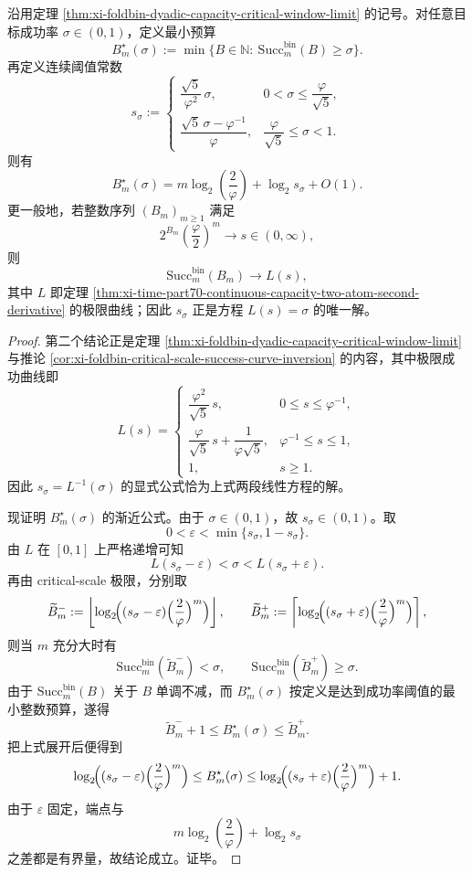 \begin{theorem}[目标成功率下最优辅助比特预算的严格分段阈值]\label{thm:xi-time-part70-target-success-optimal-budget-threshold}
沿用定理 \ref{thm:xi-foldbin-dyadic-capacity-critical-window-limit} 的记号。对任意目标成功率 \(\sigma\in(0,1)\)，定义最小预算
\[
B_m^\star(\sigma):=
\min\bigl\{B\in\mathbb N:\ \mathrm{Succ}_m^{\mathrm{bin}}(B)\ge \sigma\bigr\}.
\]
再定义连续阈值常数
\[
s_\sigma:=
\begin{cases}
\dfrac{\sqrt5}{\varphi^2}\,\sigma,
& 0<\sigma\le \dfrac{\varphi}{\sqrt5},\\[8pt]
\dfrac{\sqrt5\,\sigma-\varphi^{-1}}{\varphi},
& \dfrac{\varphi}{\sqrt5}\le \sigma<1.
\end{cases}
\]
则有
\[
B_m^\star(\sigma)
=
m\log_2\!\left(\frac{2}{\varphi}\right)+\log_2 s_\sigma+O(1).
\]
更一般地，若整数序列 \((B_m)_{m\ge 1}\) 满足
\[
2^{B_m}\left(\frac{\varphi}{2}\right)^m\longrightarrow s\in(0,\infty),
\]
则
\[
\mathrm{Succ}_m^{\mathrm{bin}}(B_m)\longrightarrow L(s),
\]
其中 \(L\) 即定理 \ref{thm:xi-time-part70-continuous-capacity-two-atom-second-derivative} 的极限曲线；因此 \(s_\sigma\) 正是方程 \(L(s)=\sigma\) 的唯一解。
\end{theorem}
\begin{proof}
第二个结论正是定理 \ref{thm:xi-foldbin-dyadic-capacity-critical-window-limit} 与推论 \ref{cor:xi-foldbin-critical-scale-success-curve-inversion} 的内容，其中极限成功曲线即
\[
L(s)=
\begin{cases}
\dfrac{\varphi^2}{\sqrt5}\,s, & 0\le s\le \varphi^{-1},\\[6pt]
\dfrac{\varphi}{\sqrt5}\,s+\dfrac{1}{\varphi\sqrt5}, & \varphi^{-1}\le s\le 1,\\[8pt]
1, & s\ge 1.
\end{cases}
\]
因此 \(s_\sigma=L^{-1}(\sigma)\) 的显式公式恰为上式两段线性方程的解。

现证明 \(B_m^\star(\sigma)\) 的渐近公式。由于 \(\sigma\in(0,1)\)，故 \(s_\sigma\in(0,1)\)。取
\[
0<\varepsilon<\min\{s_\sigma,1-s_\sigma\}.
\]
由 \(L\) 在 \([0,1]\) 上严格递增可知
\[
L(s_\sigma-\varepsilon)<\sigma<L(s_\sigma+\varepsilon).
\]
再由 critical-scale 极限，分别取
\[
\widetilde B_m^-:=\left\lfloor \log_2\!\Bigl((s_\sigma-\varepsilon)\Bigl(\frac{2}{\varphi}\Bigr)^m\Bigr)\right\rfloor,
\qquad
\widetilde B_m^+:=\left\lceil \log_2\!\Bigl((s_\sigma+\varepsilon)\Bigl(\frac{2}{\varphi}\Bigr)^m\Bigr)\right\rceil,
\]
则当 \(m\) 充分大时有
\[
\mathrm{Succ}_m^{\mathrm{bin}}(\widetilde B_m^-)<\sigma,
\qquad
\mathrm{Succ}_m^{\mathrm{bin}}(\widetilde B_m^+)\ge \sigma.
\]
由于 \(\mathrm{Succ}_m^{\mathrm{bin}}(B)\) 关于 \(B\) 单调不减，而 \(B_m^\star(\sigma)\) 按定义是达到成功率阈值的最小整数预算，遂得
\[
\widetilde B_m^-+1\le B_m^\star(\sigma)\le \widetilde B_m^+.
\]
把上式展开后便得到
\[
\log_2\!\Bigl((s_\sigma-\varepsilon)\Bigl(\frac{2}{\varphi}\Bigr)^m\Bigr)
\le
B_m^\star(\sigma)
\le
\log_2\!\Bigl((s_\sigma+\varepsilon)\Bigl(\frac{2}{\varphi}\Bigr)^m\Bigr)+1.
\]
由于 \(\varepsilon\) 固定，端点与
\[
m\log_2\!\left(\frac{2}{\varphi}\right)+\log_2 s_\sigma
\]
之差都是有界量，故结论成立。证毕。
\end{proof}

